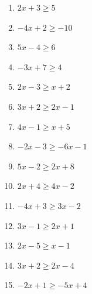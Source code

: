 \documentclass[12pt]{article}
\theoremstyle{plain}
\theoremstyle{definition}
\theoremstyle{remark}
\begin{document}
\begin{enumerate}
\def\labelenumi{\arabic{enumi}.}
\item
  \(2x + 3 \geq 5\)
\item
  \(-4x + 2 \geq -10\)
\item
  \(5x - 4 \geq 6\)
\item
  \(-3x + 7 \geq 4\)
\item
  \(2x - 3 \geq x + 2\)
\item
  \(3x + 2 \geq 2x - 1\)
\item
  \(4x - 1 \geq x + 5\)
\item
  \(-2x - 3 \geq -6x - 1\)
\item
  \(5x - 2 \geq 2x + 8\)
\item
  \(2x + 4 \geq 4x - 2\)
\item
  \(-4x + 3 \geq 3x - 2\)
\item
  \(3x - 1 \geq 2x + 1\)
\item
  \(2x - 5 \geq x - 1\)
\item
  \(3x + 2 \geq 2x - 4\)
\item
  \(-2x + 1 \geq -5x + 4\)
\end{enumerate}
\end{document}

